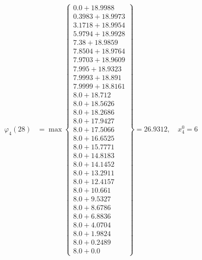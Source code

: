 \documentclass{article}
\begin{document}
\begin{align*}
  
\varphi_{4}(28) &= \max \left\{ \begin{array}{c}
0.0 + 18.9988 \\
 0.3983 + 18.9973 \\
 3.1718 + 18.9954 \\
 5.9794 + 18.9928 \\
 7.38 + 18.9859 \\
 7.8504 + 18.9764 \\
 7.9703 + 18.9609 \\
 7.995 + 18.9323 \\
 7.9993 + 18.891 \\
 7.9999 + 18.8161 \\
 8.0 + 18.712 \\
 8.0 + 18.5626 \\
 8.0 + 18.2686 \\
 8.0 + 17.9427 \\
 8.0 + 17.5066 \\
 8.0 + 16.6525 \\
 8.0 + 15.7771 \\
 8.0 + 14.8183 \\
 8.0 + 14.1452 \\
 8.0 + 13.2911 \\
 8.0 + 12.4157 \\
 8.0 + 10.661 \\
 8.0 + 9.5327 \\
 8.0 + 8.6786 \\
 8.0 + 6.8836 \\
 8.0 + 4.0704 \\
 8.0 + 1.9824 \\
 8.0 + 0.2489 \\
 8.0 + 0.0
\end{array} \right\}=26.9312,\quad x_{4}^0=6\\
  
  
  

\end{align*}
\end{document}
